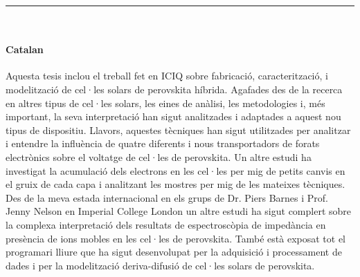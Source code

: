 {
	\vfill
	\centering \rule{5cm}{1pt}\\
	\vfill
}

\noindent

\paragraph{Catalan}
Aquesta tesis inclou el treball fet en ICIQ sobre fabricació, caracterització, i modelització de cel·les solars de perovskita híbrida.
Agafades des de la recerca en altres tipus de cel·les solars, les eines de anàlisi, les metodologies i, més important, la seva interpretació han sigut analitzades i adaptades a aquest nou tipus de dispositiu.
Llavors, aquestes tècniques han sigut utilitzades per analitzar i entendre la influència de quatre diferents i nous transportadors de forats electrònics sobre el voltatge de cel·les de perovskita.
Un altre estudi ha investigat la acumulació dels electrons en les cel·les per mig de petits canvis en el gruix de cada capa i analitzant les mostres per mig de les mateixes tècniques.
Des de la meva estada internacional en els grups de Dr. Piers Barnes i Prof. Jenny Nelson en Imperial College London un altre estudi ha sigut complert sobre la complexa interpretació dels resultats de espectroscòpia de impedància en presència de ions mobles en les cel·les de perovskita.
També està exposat tot el programari lliure que ha sigut desenvolupat per la adquisició i processament de dades i per la modelització deriva-difusió de cel·les solars de perovskita.

\vfill

